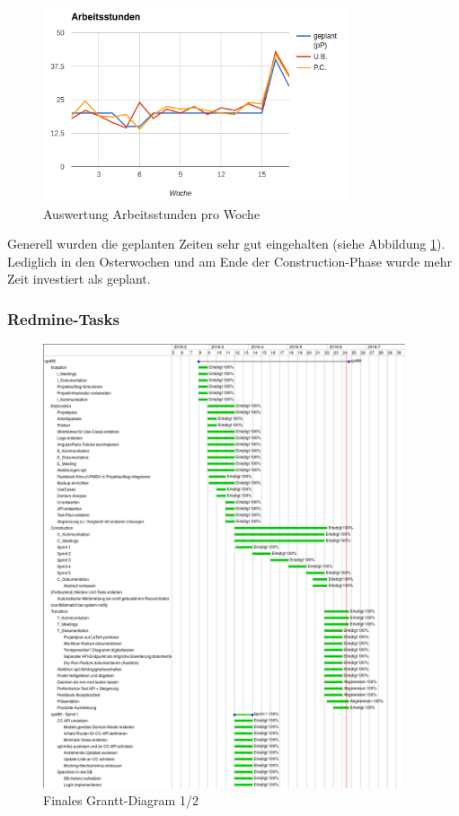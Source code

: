 \begin{figure}
  \centering
    \includegraphics[width=0.8\textwidth]{fig/arbeitsstunden}
  \caption{Auswertung Arbeitsstunden pro Woche}
  \label{fig:workinghours}
\end{figure}

Generell wurden die geplanten Zeiten sehr gut eingehalten (siehe Abbildung \ref{fig:workinghours}). Lediglich in den Osterwochen und am Ende der Construction-Phase wurde mehr Zeit investiert als geplant.

\subsubsection*{Redmine-Tasks}

\begin{figure}
  \centering
    \includegraphics[width=0.95\textwidth]{fig/upd89-gantt-part1}
  \caption{Finales Grantt-Diagram 1/2}
  \label{fig:gantt-final1}
\end{figure}

